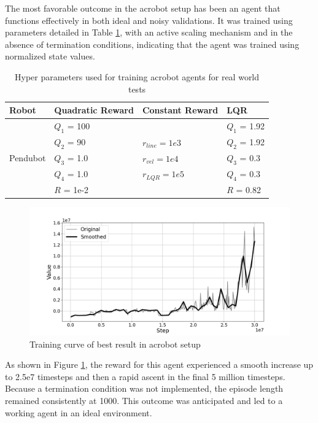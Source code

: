 The most favorable outcome in the acrobot setup has been an agent that functions effectively in both ideal and noisy validations. It was trained using parameters detailed in Table \ref{tab:training_parameters_real_world_acrobot}, with an active scaling mechanism and in the absence of termination conditions, indicating that the agent was trained using normalized state values.

\begin{table}[H]
  \centering
  \begin{tabular}{p{2cm} | p{3cm} | p{3cm} | p{3cm}}
  Robot & Quadratic Reward  & Constant Reward & LQR\\
  \hline
  \multirow{5}{*}{Pendubot} & \(Q_1\) = 100 &  & \(Q_1\) = 1.92\\
  & \(Q_2\) = 90  & \(r_{line}=1e3\) & \(Q_2\) = 1.92\\
  & \(Q_3\) = 1.0  & \(r_{vel}=1e4\) & \(Q_3\) = 0.3\\
  & \(Q_4\) = 1.0  & \(r_{LQR}=1e5\)& \(Q_4\) = 0.3\\
  & \(R\) = 1e-2  & & \(R\) = 0.82\\
  \end{tabular}
 \caption{Hyper parameters used for training acrobot agents for real world tests}
 \label{tab:training_parameters_real_world_acrobot}
\end{table}

\begin{figure}[H]
    \centering
    \includegraphics[width=1.1\linewidth]{figures/hardware_result/acrobot_learning_curve_real_world.png}
    \caption{Training curve of best result in acrobot setup}
    \label{fig:acrobot_training_curve}
\end{figure}

As shown in Figure \ref{fig:acrobot_training_curve}, the reward for this agent experienced a smooth increase up to 2.5e7 timesteps and then a rapid ascent in the final 5 million timesteps. Because a termination condition was not implemented, the episode length remained consistently at 1000. This outcome was anticipated and led to  a working agent in an ideal environment.

